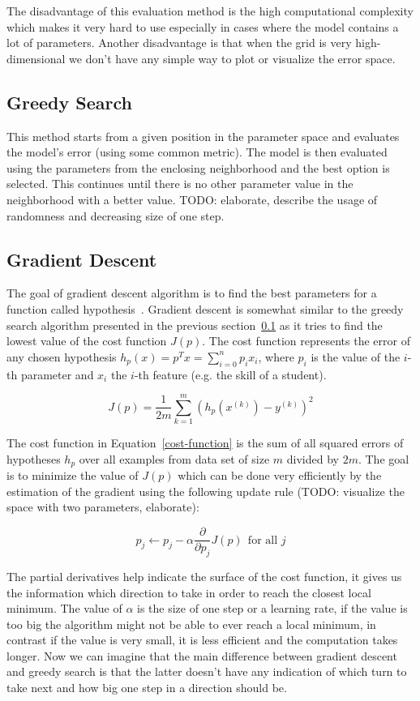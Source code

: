 The disadvantage of this evaluation method is the high computational complexity which makes it very hard to use especially in cases where the model contains a lot of parameters. Another disadvantage is that when the grid is very high-dimensional we don't have any simple way to plot or visualize the error space.

\subsection{Greedy Search}
\label{greedy-search}

This method starts from a given position in the parameter space and evaluates the model's error (using some common metric). The model is then evaluated using the parameters from the enclosing neighborhood and the best option is selected. This continues until there is no other parameter value in the neighborhood with a better value. TODO: elaborate, describe the usage of randomness and decreasing size of one step.

\subsection{Gradient Descent}

The goal of gradient descent algorithm is to find the best parameters for a function called hypothesis~\cite{Klusasek2014}. Gradient descent is somewhat similar to the greedy search algorithm presented in the previous section~\ref{greedy-search} as it tries to find the lowest value of the cost function $J(p)$. The cost function represents the error of any chosen hypothesis $h_{p}(x) = p^T x = \sum^n_{i=0} p_i x_i$, where $p_i$ is the value of the $i$-th parameter and $x_i$ the $i$-th feature (e.g. the skill of a student).

\begin{equation} \label{cost-function}
  J(p) = \frac{1}{2m} \sum^m_{k=1} (h_p(x^{(k)}) - y^{(k)})^2
\end{equation}

The cost function in Equation~\ref{cost-function} is the sum of all squared errors of hypotheses $h_p$ over all examples from data set of size $m$ divided by $2m$. The goal is to minimize the value of $J(p)$ which can be done very efficiently by the estimation of the gradient using the following update rule (TODO: visualize the space with two parameters, elaborate):

\begin{equation} \label{cost-function-update}
  p_j \gets p_j - \alpha \frac{\partial}{\partial p_j} J(p)~~\text{for all } j
\end{equation}

The partial derivatives help indicate the surface of the cost function, it gives us the information which direction to take in order to reach the closest local minimum. The value of $\alpha$ is the size of one step or a learning rate, if the value is too big the algorithm might not be able to ever reach a local minimum, in contrast if the value is very small, it is less efficient and the computation takes longer. Now we can imagine that the main difference between gradient descent and greedy search is that the latter doesn't have any indication of which turn to take next and how big one step in a direction should be.
